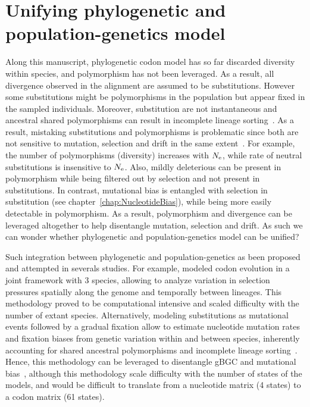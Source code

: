 \section{Unifying phylogenetic and population-genetics model}
\label{sec:unifying-phylogenetic-and-population-genetics-model}

Along this manuscript, phylogenetic codon model has so far discarded diversity within species, and polymorphism has not been leveraged.
As a result, all divergence observed in the alignment are assumed to be substitutions.
However some substitutions might be polymorphisms in the population but appear fixed in the sampled individuals.
Moreover, substitution are not instantaneous and ancestral shared polymorphisms can result in incomplete lineage sorting~\citep{Charlesworth2010}.
As a result, mistaking substitutions and polymorphisms is problematic since both are not sensitive to mutation, selection and drift in the same extent~\citep{Mugal2014}.
For example, the number of polymorphisms (diversity) increases with $N_{\textrm{e}}$, while rate of neutral substitutions is insensitive to $N_{\textrm{e}}$.
Also, mildly deleterious can be present in polymorphism while being filtered out by selection and not present in substitutions.
In contrast, mutational bias is entangled with selection in substitution (see chapter~\ref{chap:NucleotideBias}), while being more easily detectable in polymorphism.
As a result, polymorphism and divergence can be leveraged altogether to help disentangle mutation, selection and drift.
As such we can wonder whether phylogenetic and population-genetics model can be unified?

Such integration between phylogenetic and population-genetics as been proposed \citep{Thorne2012} and attempted in severals studies.
For example, \citet{Wilson2011} modeled codon evolution in a joint framework with $3$ species, allowing to analyze variation in selection pressures spatially along the genome and temporally between lineages.
This methodology proved to be computational intensive and scaled difficulty with the number of extant species.
Alternatively, modeling substitutions as mutational events followed by a gradual fixation allow to estimate nucleotide mutation rates and fixation biases from genetic variation within and between species, inherently accounting for shared ancestral polymorphisms and incomplete lineage sorting~\citep{DeMaio2013, Schrempf2016, Bergman2018, Schrempf2019}.
Hence, this methodology can be leveraged to disentangle gBGC and mutational bias~\citep{Borges2019, Borges2020}, although this methodology scale difficulty with the number of states of the models, and would be difficult to translate from a nucleotide matrix (4 states) to a codon matrix (61 states).


